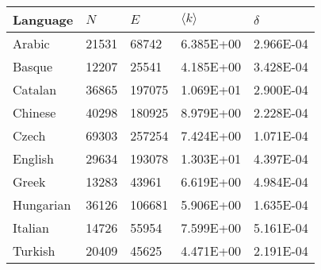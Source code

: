\begin{tabular}{lllll}
\toprule
 Language   & $N$   & $E$    & $\langle k \rangle$   & $\delta$   \\
\midrule
 Arabic     & 21531 & 68742  & \num{6.385E+00}             & \num{2.966E-04}  \\
 Basque     & 12207 & 25541  & \num{4.185E+00}             & \num{3.428E-04}  \\
 Catalan    & 36865 & 197075 & \num{1.069E+01}             & \num{2.900E-04}  \\
 Chinese    & 40298 & 180925 & \num{8.979E+00}             & \num{2.228E-04}  \\
 Czech      & 69303 & 257254 & \num{7.424E+00}             & \num{1.071E-04}  \\
 English    & 29634 & 193078 & \num{1.303E+01}             & \num{4.397E-04}  \\
 Greek      & 13283 & 43961  & \num{6.619E+00}             & \num{4.984E-04}  \\
 Hungarian  & 36126 & 106681 & \num{5.906E+00}             & \num{1.635E-04}  \\
 Italian    & 14726 & 55954  & \num{7.599E+00}             & \num{5.161E-04}  \\
 Turkish    & 20409 & 45625  & \num{4.471E+00}             & \num{2.191E-04}  \\
\bottomrule
\end{tabular}